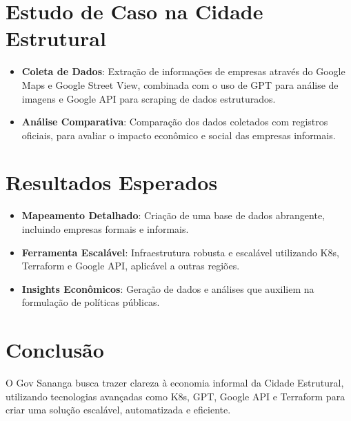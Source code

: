 \documentclass{article}
\begin{document}
\section*{Estudo de Caso na Cidade Estrutural}

\begin{itemize}
    \item \textbf{Coleta de Dados}: Extração de informações de empresas através do Google Maps e Google Street View, combinada com o uso de GPT para análise de imagens e Google API para scraping de dados estruturados.
    \item \textbf{Análise Comparativa}: Comparação dos dados coletados com registros oficiais, para avaliar o impacto econômico e social das empresas informais.
\end{itemize}

\section*{Resultados Esperados}

\begin{itemize}
    \item \textbf{Mapeamento Detalhado}: Criação de uma base de dados abrangente, incluindo empresas formais e informais.
    \item \textbf{Ferramenta Escalável}: Infraestrutura robusta e escalável utilizando K8s, Terraform e Google API, aplicável a outras regiões.
    \item \textbf{Insights Econômicos}: Geração de dados e análises que auxiliem na formulação de políticas públicas.
\end{itemize}

\section*{Conclusão}

O Gov Sananga busca trazer clareza à economia informal da Cidade Estrutural, utilizando tecnologias avançadas como K8s, GPT, Google API e Terraform para criar uma solução escalável, automatizada e eficiente.
\end{document}
